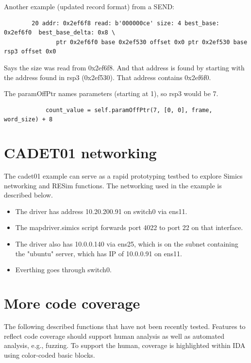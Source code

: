 \documentclass[titlepage]{article}
\begin{document}
\begin{appendices}
Another example (updated record format) from a SEND:
\begin{verbatim}
        20 addr: 0x2ef6f8 read: b'000000ce' size: 4 best_base: 0x2ef6f0  best_base_delta: 0x8 \
               ptr 0x2ef6f0 base 0x2ef530 offset 0x0 ptr 0x2ef530 base rsp3 offset 0x0
\end{verbatim}
Says the size was read from 0x2ef6f8.  And that address is found by starting with the address found in rsp3 (0x2ef530).
That address contains 0x2ef6f0. 

The paramOffPtr names parameters (starting at 1), so rsp3 would be 7. 
\begin{verbatim}
            count_value = self.paramOffPtr(7, [0, 0], frame, word_size) + 8
\end{verbatim}

\section{CADET01 networking}
The cadet01 example can serve as a rapid prototyping testbed to explore Simics networking and RESim functions.
The networking used in the example is described below.
\begin{itemize}
\item The driver has address 10.20.200.91 on switch0 via ens11.  
\item The mapdriver.simics script forwards port 4022 to
port 22 on that interface.  
\item The driver also has 10.0.0.140 via ens25, which is on the subnet containing the
"ubuntu" server, which has IP of 10.0.0.91 on ens11.  
\item Everthing goes through switch0.
\end{itemize}

\section{More code coverage}
The following described functions that have not been recently tested.
Features to reflect code coverage should support human analysis as well as automated analysis, e.g., fuzzing.  To support the human, coverage is highlighted within IDA using color-coded basic blocks.  


\end{appendices}
\end{document}
